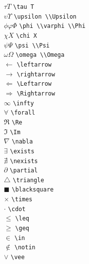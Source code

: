 \documentclass{article}
\newenvironment{tighttabbing}
  {\begingroup\setlength{\parskip}{0pt}\begin{tabbing}}
  {\end{tabbing}\endgroup}
\begin{document}
\begin{multicols*}{3}
\begin{multicols*}{3}
\begin{tighttabbing}
        $\tau T$                  \> \lstinline{\tau T} \\
        $\upsilon \Upsilon$       \> \lstinline{\upsilon \\Upsilon} \\
        $\phi \varphi \Phi$       \> \lstinline{\phi \\varphi \\Phi} \\
        $\chi X$                  \> \lstinline{\chi X} \\
        $\psi \Psi$               \> \lstinline{\psi \\Psi} \\
        $\omega \Omega$ \> \lstinline{\omega \\Omega} \\
        $\leftarrow$    \> \lstinline{\leftarrow} \\
        $\rightarrow$   \> \lstinline{\rightarrow} \\
        $\Leftarrow$    \> \lstinline{\Leftarrow} \\
        $\Rightarrow$   \> \lstinline{\Rightarrow} \\
        $\infty$        \> \lstinline{\infty} \\
        $\forall$       \> \lstinline{\forall} \\
        $\Re$           \> \lstinline{\Re} \\
        $\Im$           \> \lstinline{\Im} \\
        $\nabla$        \> \lstinline{\nabla} \\
        $\exists$       \> \lstinline{\exists} \\
        $\nexists$      \> \lstinline{\nexists} \\
        $\partial$      \> \lstinline{\partial} \\
        $\triangle$     \> \lstinline{\triangle} \\
        $\blacksquare$  \> \lstinline{\blacksquare} \\
        $\times$        \> \lstinline{\times} \\
        $\cdot$         \> \lstinline{\cdot} \\
        $\leq$          \> \lstinline{\leq} \\
        $\geq$          \> \lstinline{\geq} \\
        $\in$           \> \lstinline{\in} \\
        $\notin$        \> \lstinline{\notin} \\
        $\vee$          \> \lstinline{\vee} \\
    \end{tighttabbing}


\end{multicols*}
\end{multicols*}
\end{document}
